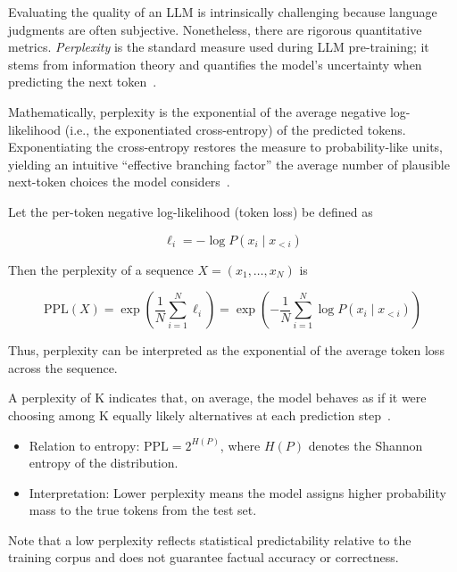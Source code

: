 Evaluating the quality of an \ac{LLM} is intrinsically challenging because language judgments are often subjective. 
Nonetheless, there are rigorous quantitative metrics. \emph{Perplexity} is the standard measure used during \ac{LLM} pre-training; 
it stems from information theory and quantifies the model's uncertainty when predicting the next token~\cite{site:wikipediaPerplexityWikipedia}.

Mathematically, perplexity is the exponential of the average negative log-likelihood (i.e., the exponentiated cross-entropy) 
of the predicted tokens. Exponentiating the cross-entropy restores the measure to probability-like units, yielding an intuitive 
``effective branching factor'' the average number of plausible next-token choices the model considers~\cite{site:cometPerplexityEvaluation}.

Let the per-token negative log-likelihood (token loss) be defined as~\cite{paper:ruan2025enhancinglargelanguagemodel}

\[
\ell_i = -\log P(x_i \mid x_{<i})
\]

Then the perplexity of a sequence \(X = (x_1, \dots, x_N)\) is

\[
\mathrm{PPL}(X) = \exp\!\left(\frac{1}{N} \sum_{i=1}^{N} \ell_i \right)
= \exp\!\left( -\frac{1}{N} \sum_{i=1}^N \log P(x_i \mid x_{<i}) \right)
\]

Thus, perplexity can be interpreted as the exponential of the average token loss 
across the sequence.

A perplexity of K indicates that, on average, the model behaves as if it were choosing among K equally likely alternatives at each prediction step~\cite{site:UnderstandingPerplexity}.
\begin{itemize}
    \item Relation to entropy: \(\mathrm{PPL} = 2^{H(P)}\), where \(H(P)\) denotes the Shannon entropy of the distribution.
    \item Interpretation: Lower perplexity means the model assigns higher probability mass to the true tokens from the test set.
\end{itemize}
Note that a low perplexity reflects statistical predictability relative to the training corpus and does not guarantee factual accuracy or correctness.

